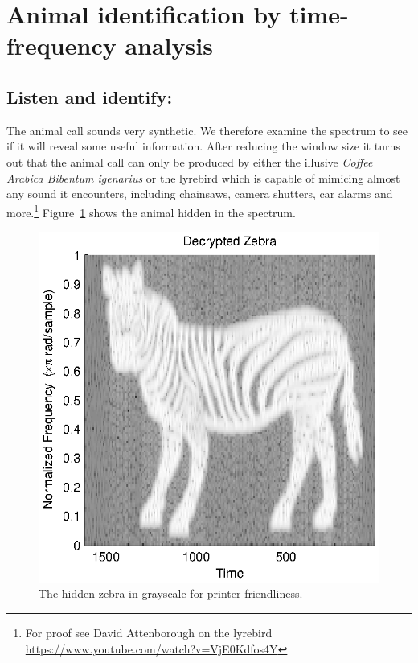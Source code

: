 \section{Animal identification by time-frequency analysis}
\subsection{Listen and identify:}
The animal call sounds very synthetic. We therefore examine the spectrum to see if it 
will reveal some useful information. After reducing the window size it turns out that
the animal call can only be produced by either the illusive \emph{Coffee Arabica Bibentum igenarius}
or the lyrebird which is capable of mimicing almost any sound it encounters, including chainsaws,
camera shutters, car alarms and more.\footnote{For proof see David Attenborough on the lyrebird \url{https://www.youtube.com/watch?v=VjE0Kdfos4Y}}
Figure~\ref{fig:zebra} shows the animal hidden in the spectrum.
\begin{figure}[H]
	\center
	\includegraphics{./picture/zebra.eps}
	\caption{The hidden zebra in grayscale for printer friendliness.}
	\label{fig:zebra}
\end{figure}
